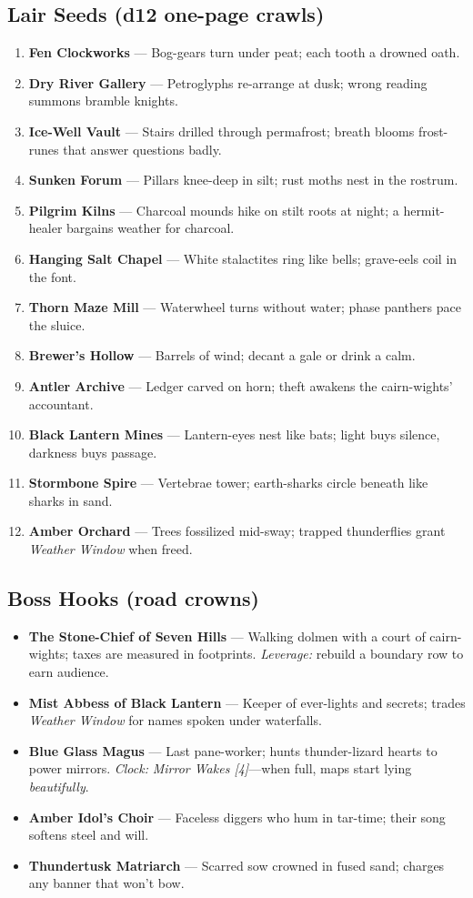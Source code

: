 \subsection*{Lair Seeds (d12 one-page crawls)}
\begin{enumerate}
  \item \textbf{Fen Clockworks} — Bog-gears turn under peat; each tooth a drowned oath.
  \item \textbf{Dry River Gallery} — Petroglyphs re-arrange at dusk; wrong reading summons bramble knights.
  \item \textbf{Ice-Well Vault} — Stairs drilled through permafrost; breath blooms frost-runes that answer questions badly.
  \item \textbf{Sunken Forum} — Pillars knee-deep in silt; rust moths nest in the rostrum.
  \item \textbf{Pilgrim Kilns} — Charcoal mounds hike on stilt roots at night; a hermit-healer bargains weather for charcoal.
  \item \textbf{Hanging Salt Chapel} — White stalactites ring like bells; grave-eels coil in the font.
  \item \textbf{Thorn Maze Mill} — Waterwheel turns without water; phase panthers pace the sluice.
  \item \textbf{Brewer’s Hollow} — Barrels of wind; decant a gale or drink a calm.
  \item \textbf{Antler Archive} — Ledger carved on horn; theft awakens the cairn-wights’ accountant.
  \item \textbf{Black Lantern Mines} — Lantern-eyes nest like bats; light buys silence, darkness buys passage.
  \item \textbf{Stormbone Spire} — Vertebrae tower; earth-sharks circle beneath like sharks in sand.
  \item \textbf{Amber Orchard} — Trees fossilized mid-sway; trapped thunderflies grant \emph{Weather Window} when freed.
\end{enumerate}

\subsection*{Boss Hooks (road crowns)}
\begin{itemize}
  \item \textbf{The Stone-Chief of Seven Hills} — Walking dolmen with a court of cairn-wights; taxes are measured in footprints. \emph{Leverage:} rebuild a boundary row to earn audience.
  \item \textbf{Mist Abbess of Black Lantern} — Keeper of ever-lights and secrets; trades \emph{Weather Window} for names spoken under waterfalls.
  \item \textbf{Blue Glass Magus} — Last pane-worker; hunts thunder-lizard hearts to power mirrors. \emph{Clock:} \emph{Mirror Wakes [4]}—when full, maps start lying \emph{beautifully}.
  \item \textbf{Amber Idol’s Choir} — Faceless diggers who hum in tar-time; their song softens steel and will.
  \item \textbf{Thundertusk Matriarch} — Scarred sow crowned in fused sand; charges any banner that won’t bow.
\end{itemize}

